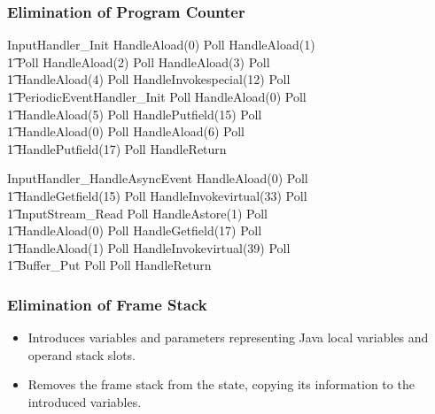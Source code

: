 \documentclass{beamer}
\begin{document}
\begin{frame}[shrink]
  \frametitle{Elimination of Program Counter}
  \setlength{\zedleftsep}{0cm}
  \setlength{\zedindent}{0cm}
  \begin{circus}
    InputHandler\_Init \circdef HandleAload(0) \circseq Poll \circseq HandleAload(1) \circseq \\
    \t1 Poll \circseq HandleAload(2) \circseq Poll \circseq HandleAload(3) \circseq Poll \circseq \\
    \t1 HandleAload(4) \circseq Poll \circseq HandleInvokespecial(12) \circseq Poll \circseq \\
    \t1 PeriodicEventHandler\_Init \circseq Poll \circseq HandleAload(0) \circseq Poll \circseq \\
    \t1 HandleAload(5) \circseq Poll \circseq HandlePutfield(15) \circseq Poll \circseq \\
    \t1 HandleAload(0) \circseq Poll \circseq HandleAload(6) \circseq Poll \circseq \\
    \t1 HandlePutfield(17) \circseq Poll \circseq HandleReturn
  \end{circus}
  \begin{circus}
    InputHandler\_HandleAsyncEvent \circdef HandleAload(0) \circseq Poll \circseq \\
    \t1 HandleGetfield(15) \circseq Poll \circseq HandleInvokevirtual(33) \circseq Poll \circseq \\
    \t1 InputStream\_Read \circseq Poll \circseq HandleAstore(1) \circseq Poll \circseq \\
    \t1 HandleAload(0) \circseq Poll \circseq HandleGetfield(17) \circseq Poll \circseq \\
    \t1 HandleAload(1) \circseq Poll \circseq HandleInvokevirtual(39) \circseq Poll \circseq \\
    \t1 Buffer\_Put \circseq Poll \circseq Poll \circseq HandleReturn
  \end{circus}
\end{frame}

\begin{frame}
  \frametitle{Elimination of Frame Stack}
  \begin{itemize}
  \item Introduces variables and parameters representing Java local
    variables and operand stack slots.
  \item Removes the frame stack from the state, copying its
    information to the introduced variables.
  \end{itemize}
\end{frame}
\end{document}
